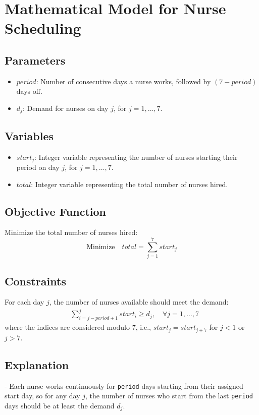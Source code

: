 \documentclass{article}
\begin{document}
\section*{Mathematical Model for Nurse Scheduling}

\subsection*{Parameters}
\begin{itemize}
    \item $period$: Number of consecutive days a nurse works, followed by $(7 - period)$ days off.
    \item $d_j$: Demand for nurses on day $j$, for $j = 1, \ldots, 7$.
\end{itemize}

\subsection*{Variables}
\begin{itemize}
    \item $start_j$: Integer variable representing the number of nurses starting their period on day $j$, for $j = 1, \ldots, 7$.
    \item $total$: Integer variable representing the total number of nurses hired.
\end{itemize}

\subsection*{Objective Function}
Minimize the total number of nurses hired:
\[
\text{Minimize} \quad total = \sum_{j=1}^{7} start_j
\]

\subsection*{Constraints}
For each day $j$, the number of nurses available should meet the demand:
\[
\begin{align*}
& \sum_{i=j-period+1}^{j} start_i \geq d_j, \quad \forall j = 1, \ldots, 7
\end{align*}
\]
where the indices are considered modulo 7, i.e., $start_{j} = start_{j+7}$ for $j < 1$ or $j > 7$. 

\subsection*{Explanation}
- Each nurse works continuously for \texttt{period} days starting from their assigned start day, so for any day $j$, the number of nurses who start from the last \texttt{period} days should be at least the demand $d_j$.
\end{document}
